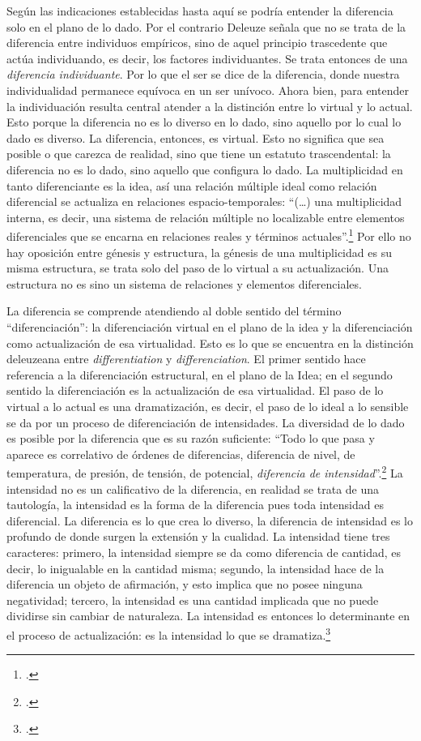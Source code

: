 \documentclass{book}
\begin{document}
Según las indicaciones establecidas hasta aquí se podría entender la
diferencia solo en el plano de lo dado. Por el contrario Deleuze señala
que no se trata de la diferencia entre individuos empíricos, sino de
aquel principio trascedente que actúa individuando, es decir, los
factores individuantes. Se trata entonces de una \emph{diferencia
individuante}. Por lo que el ser se dice de la diferencia, donde nuestra
individualidad permanece equívoca en un ser unívoco. Ahora bien, para
entender la individuación resulta central atender a la distinción entre
lo virtual y lo actual. Esto porque la diferencia no es lo diverso en lo
dado, sino aquello por lo cual lo dado es diverso. La diferencia,
entonces, es virtual. Esto no significa que sea posible o que carezca de
realidad, sino que tiene un estatuto trascendental: la diferencia no es
lo dado, sino aquello que configura lo dado. La multiplicidad en tanto
diferenciante es la idea, así una relación múltiple ideal como relación
diferencial se actualiza en relaciones espacio-temporales: \enquote{(\dots)
una multiplicidad interna, es decir, una sistema de relación múltiple no
localizable entre elementos diferenciales que se encarna en relaciones
reales y términos actuales}.\footcite[278]{deleuze2008} Por ello no hay oposición
entre génesis y estructura, la génesis de una multiplicidad es su misma
estructura, se trata solo del paso de lo virtual a su actualización. Una
estructura no es sino un sistema de relaciones y elementos
diferenciales.

La diferencia se comprende atendiendo al doble sentido del término
\enquote{diferenciación}: la diferenciación virtual en el plano de la idea y la
diferenciación como actualización de esa virtualidad. Esto es lo que se
encuentra en la distinción deleuzeana entre \emph{differentiation} y
\emph{differenciation}. El primer sentido hace referencia a la
diferenciación estructural, en el plano de la Idea; en el segundo
sentido la diferenciación es la actualización de esa virtualidad. El
paso de lo virtual a lo actual es una dramatización, es decir, el paso
de lo ideal a lo sensible se da por un proceso de diferenciación de
intensidades. La diversidad de lo dado es posible por la diferencia que
es su razón suficiente: \enquote{Todo lo que pasa y aparece es correlativo de
órdenes de diferencias, diferencia de nivel, de temperatura, de presión,
de tensión, de potencial, \emph{diferencia de intensidad}}.\footcite[333]{deleuze2008}
La intensidad no es un calificativo de la diferencia, en
realidad se trata de una tautología, la intensidad es la forma de la
diferencia pues toda intensidad es diferencial. La diferencia es lo que
crea lo diverso, la diferencia de intensidad es lo profundo de donde
surgen la extensión y la cualidad. La intensidad tiene tres caracteres:
primero, la intensidad siempre se da como diferencia de cantidad, es
decir, lo inigualable en la cantidad misma; segundo, la intensidad hace
de la diferencia un objeto de afirmación, y esto implica que no posee
ninguna negatividad; tercero, la intensidad es una cantidad implicada
que no puede dividirse sin cambiar de naturaleza. La intensidad es
entonces lo determinante en el proceso de actualización: es la
intensidad lo que se dramatiza.\footcite{deleuze2005c}
\end{document}
